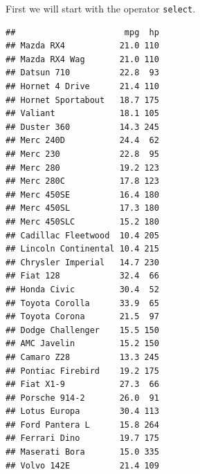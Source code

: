 \documentclass[]{report}
\newenvironment{Shaded}{\begin{snugshade}}{\end{snugshade}}
\newcommand{\KeywordTok}[1]{\textcolor[rgb]{0.13,0.29,0.53}{\textbf{#1}}}
\newcommand{\StringTok}[1]{\textcolor[rgb]{0.31,0.60,0.02}{#1}}
\newcommand{\CommentTok}[1]{\textcolor[rgb]{0.56,0.35,0.01}{\textit{#1}}}
\newcommand{\OperatorTok}[1]{\textcolor[rgb]{0.81,0.36,0.00}{\textbf{#1}}}
\newcommand{\NormalTok}[1]{#1}
\begin{document}
First we will start with the operator \texttt{select}.

\begin{Shaded}
\end{Shaded}

\begin{verbatim}
##                      mpg  hp
## Mazda RX4           21.0 110
## Mazda RX4 Wag       21.0 110
## Datsun 710          22.8  93
## Hornet 4 Drive      21.4 110
## Hornet Sportabout   18.7 175
## Valiant             18.1 105
## Duster 360          14.3 245
## Merc 240D           24.4  62
## Merc 230            22.8  95
## Merc 280            19.2 123
## Merc 280C           17.8 123
## Merc 450SE          16.4 180
## Merc 450SL          17.3 180
## Merc 450SLC         15.2 180
## Cadillac Fleetwood  10.4 205
## Lincoln Continental 10.4 215
## Chrysler Imperial   14.7 230
## Fiat 128            32.4  66
## Honda Civic         30.4  52
## Toyota Corolla      33.9  65
## Toyota Corona       21.5  97
## Dodge Challenger    15.5 150
## AMC Javelin         15.2 150
## Camaro Z28          13.3 245
## Pontiac Firebird    19.2 175
## Fiat X1-9           27.3  66
## Porsche 914-2       26.0  91
## Lotus Europa        30.4 113
## Ford Pantera L      15.8 264
## Ferrari Dino        19.7 175
## Maserati Bora       15.0 335
## Volvo 142E          21.4 109
\end{verbatim}

\begin{Shaded}
\end{Shaded}
\end{document}
